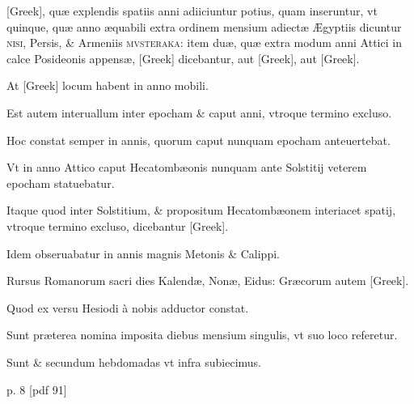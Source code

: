 \begin{parnumbers}
\textgreek{[Greek]}, quæ explendis spatiis anni adiiciuntur potius,
quam inseruntur, vt quinque, quæ anno æquabili extra ordinem mensium
adiectæ Ægyptiis dicuntur \textsc{nisi}, Persis, \& Armeniis \textsc{mvsteraka}: 
item duæ, quæ extra modum anni Attici in calce Posideonis 
appensæ, \textgreek{[Greek]} dicebantur,
 aut \textgreek{[Greek]}, aut \textgreek{[Greek]}.

At \textgreek{[Greek]} locum habent in anno mobili.

Est autem interuallum
inter epocham \& caput anni, vtroque termino excluso.

Hoc
constat semper in annis, quorum caput nunquam epocham anteuertebat.

Vt in anno Attico caput Hecatombæonis nunquam ante Solstitij
veterem epocham statuebatur.

Itaque quod inter Solstitium, \&
propositum Hecatombæonem interiacet spatij, vtroque termino excluso,
dicebantur \textgreek{[Greek]}.

Idem obseruabatur in annis magnis
Metonis \& Calippi.

Rursus Romanorum sacri dies Kalendæ, Nonæ,
Eidus: Græcorum autem \textgreek{[Greek]}.

Quod ex versu Hesiodi à
nobis adductor constat.

Sunt præterea nomina imposita diebus mensium 
singulis, vt suo loco referetur.

Sunt \& secundum hebdomadas
vt infra subiecimus.

\end{parnumbers}
\clearpage
p. 8 [pdf 91]

